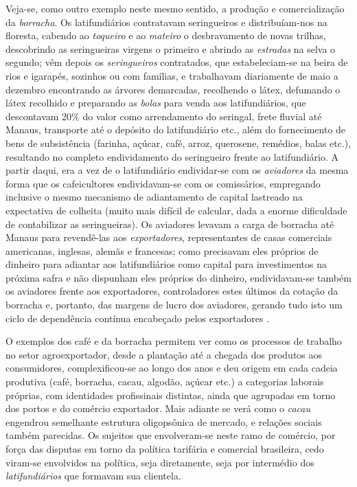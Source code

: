Veja-se, como outro exemplo neste mesmo sentido, a produção e comercialização da \textit{borracha}. Os latifundiários contratavam seringueiros e distribuíam-nos na floresta, cabendo ao \textit{toqueiro} e ao \textit{mateiro} o desbravamento de novas trilhas, descobrindo as seringueiras virgens o primeiro e abrindo as \textit{estradas} na selva o segundo; vêm depois os \textit{seringueiros} contratados, que estabeleciam-se na beira de rios e igarapés, sozinhos ou com famílias, e trabalhavam diariamente de maio a dezembro encontrando as árvores demarcadas, recolhendo o látex, defumando o látex recolhido e preparando as \textit{bolas} para venda aos latifundiários, que descontavam 20\% do valor como arrendamento do seringal, frete fluvial até Manaus, transporte até o depósito do latifundiário etc., além do fornecimento de bens de subsistência (farinha, açúcar, café, arroz, querosene, remédios, balas etc.), resultando no completo endividamento do seringueiro frente ao latifundiário. A partir daqui, era a vez de o latifundiário endividar-se com os \textit{aviadores} da mesma forma que os cafeicultores endividavam-se com os comissários, empregando inclusive o mesmo mecanismo de adiantamento de capital lastreado na expectativa de colheita (muito mais difícil de calcular, dada a enorme dificuldade de contabilizar as seringueiras). Os aviadores levavam a carga de borracha até Manaus para revendê-las aos \textit{exportadores}, representantes de casas comerciais americanas, inglesas, alemãs e francesas; como precisavam eles próprios de dinheiro para adiantar aos latifundiários como capital para investimentos na próxima safra e não dispunham eles próprios do dinheiro, endividavam-se também os aviadores frente aos exportadores, controladores estes últimos da cotação da borracha e, portanto, das margens de lucro dos aviadores, gerando tudo isto um ciclo de dependência contínua encabeçado pelos exportadores \cite[pp.~62-68]{CARONE1970inst}. 

O exemplos dos café e da borracha permitem ver como os processos de trabalho no setor agroexportador, desde a plantação até a chegada dos produtos aos consumidores, complexificou-se ao longo dos anos e deu origem em cada cadeia produtiva (café, borracha, cacau, algodão, açúcar etc.) a categorias laborais próprias, com identidades profissinais distintas, ainda que agrupadas em torno dos portos e do comércio exportador. Mais adiante se verá como o \textit{cacau} engendrou semelhante estrutura oligopsônica de mercado, e relações sociais também parecidas. Os sujeitos que envolveram-se neste ramo de comércio, por força das disputas em torno da política tarifária e comercial brasileira, cedo viram-se envolvidos na política, seja diretamente, seja por intermédio dos \textit{latifundiários} que formavam sua clientela. 

